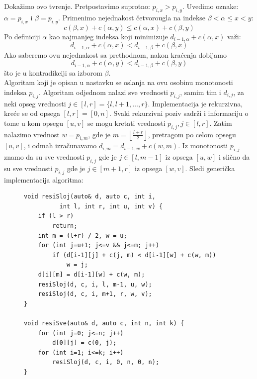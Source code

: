 \documentclass[a4paper,12pt]{article}
\providecommand{\floor}[1]{\left \lfloor #1 \right \rfloor }
\numberwithin{equation}{subsection}
\begin{document}
Doka\v zimo ovo tvr\dj enje. Pretpostavimo suprotno: $p_{i,x} > p_{i,y}$. Uvedimo oznake: $\alpha = p_{i,x}$ i $ \beta = p_{i,y}$. Primenimo nejednakost \v cetvorougla na indekse $\beta < \alpha \leq x < y$:
$$
	c(\beta, x) + c(\alpha, y) \leq c(\alpha, x) + c(\beta, y)
$$
Po definiciji $\alpha$ kao najmanjeg indeksa koji minimizuje $d_{i-1, \alpha} + c(\alpha, x)$ va\v zi:
$$
	d_{i-1, \alpha} + c(\alpha, x)
		<
	d_{i-1, \beta} + c(\beta, x)
$$
Ako saberemo ovu nejednakost sa prethodnom, nakon kra\' cenja dobijamo
$$
	d_{i-1, \alpha} + c(\alpha, y) < d_{i-1, \beta} + c(\beta, y)
$$
\v sto je u kontradikciji sa izborom $\beta$.
\\

Algoritam koji je opisan u nastavku se oslanja na ovu osobinu monotonosti indeksa $p_{i,j}$. Algoritam odjednom nalazi sve vrednosti $p_{i,j}$, samim tim i $d_{i,j}$, za neki opseg vrednosti $j \in [l,r] = \{ l, l+1, \ldots, r \}$. Implementacija je rekurzivna, kre\' ce se od opsega $[l,r] = [0, n]$. Svaki rekurzivni poziv sadr\v zi i informaciju o tome u kom opsegu $[u, v]$ se mogu kretati vrednosti $p_{i,j}, j \in [l, r]$. Zatim nalazimo vrednost $w = p_{i,m}$, gde je $m = \floor{\frac{l+r}{2}}$, pretragom po celom opsegu $[u,v]$, i odmah izra\v cunavamo $d_{i,m} = d_{i-1, w} + c(w, m)$. Iz monotonosti $p_{i, j}$ znamo da su sve vrednosti $p_{i,j}$ gde je $j \in [l, m-1]$ iz opsega $[u, w]$ i sli\v cno da su sve vrednosti $p_{i,j}$ gde je $j \in [m+1, r]$ iz opsega $[w, v]$. Sledi generi\v cka implementacija algoritma:

\begin{figure}[H]
\begin{verbatim}
void resiSloj(auto& d, auto c, int i,
          int l, int r, int u, int v) {
    if (l > r)
        return;
    int m = (l+r) / 2, w = u;
    for (int j=u+1; j<=v && j<=m; j++)
        if (d[i-1][j] + c(j, m) < d[i-1][w] + c(w, m))
            w = j;
    d[i][m] = d[i-1][w] + c(w, m);
    resiSloj(d, c, i, l, m-1, u, w);
    resiSloj(d, c, i, m+1, r, w, v);
}

void resiSve(auto& d, auto c, int n, int k) {
    for (int j=0; j<=n; j++)
        d[0][j] = c(0, j);
    for (int i=1; i<=k; i++)
        resiSloj(d, c, i, 0, n, 0, n);
}
\end{verbatim}
\end{figure}
\end{document}
